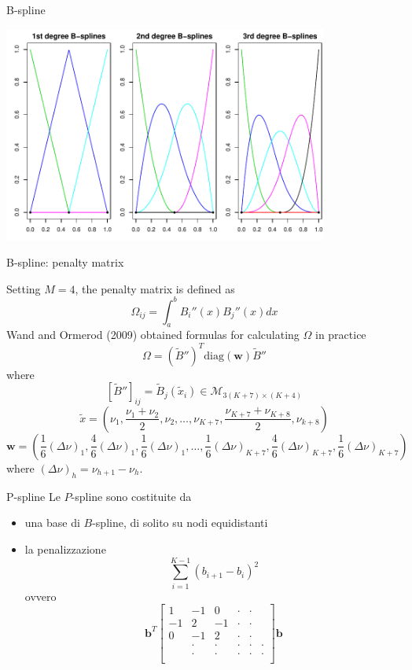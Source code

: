 \documentclass{beamer}\usepackage[]{graphicx}\usepackage[]{color}
\makeatletter
\newenvironment{kframe}{%
 \def\at@end@of@kframe{}%
 \ifinner\ifhmode%
  \def\at@end@of@kframe{\end{minipage}}%
  \begin{minipage}{\columnwidth}%
 \fi\fi%
 \def\FrameCommand##1{\hskip\@totalleftmargin \hskip-\fboxsep
 \colorbox{shadecolor}{##1}\hskip-\fboxsep
     \hskip-\linewidth \hskip-\@totalleftmargin \hskip\columnwidth}%
 \MakeFramed {\advance\hsize-\width
   \@totalleftmargin\z@ \linewidth\hsize
   \@setminipage}}%
 {\par\unskip\endMakeFramed%
 \at@end@of@kframe}
\newenvironment{knitrout}{}{} %
\makeatother
\begin{document}
\begin{frame}[fragile,allowframebreaks=0.95]{B-spline}
\begin{knitrout}
\color{fgcolor}\begin{kframe}


{\ttfamily\noindent\bfseries{}}\end{kframe}
\includegraphics[width=0.8\textwidth,height=0.8\textheight]{figure/020-regression-1bsplineA-1} 

\end{knitrout}
\end{frame}

\begin{frame}{B-spline: penalty matrix}

Setting $M=4$, the penalty matrix is defined as
\[ \Omega_{ij} = \int_a^b B_i''(x)B_j''(x)dx  \]
Wand and Ormerod (2009) obtained formulas for calculating $\Omega$ in practice
\[ \Omega = (\tilde{B}'')^T \mbox{diag}(\mathbf w) \tilde{B}''  \]
where 
\[ [\tilde{B}'']_{ij} = \tilde{B}_j(\tilde{x}_i) \in\mathcal M_{3(K+7)\times(K+4)}\]
\[ \tilde{x} = \left(\nu_1,\frac{\nu_1+\nu_2}{2},\nu_2,\ldots,\nu_{K+7},\frac{\nu_{K+7}+\nu_{K+8}}{2},\nu_{k+8} \right) \]
\[ {\mathbf w} = \left(\frac{1}{6}(\Delta\nu)_1,\frac{4}{6}(\Delta\nu)_1,\frac{1}{6}(\Delta\nu)_1, \ldots, \frac{1}{6}(\Delta\nu)_{K+7},\frac{4}{6}(\Delta\nu)_{K+7},\frac{1}{6}(\Delta\nu)_{K+7}\right) \]
where $(\Delta\nu)_h=\nu_{h+1}-\nu_h$.
\end{frame}

\begin{frame}{P-spline}
Le $P$-spline sono costituite da
\begin{itemize}
\item una base di $B$-spline, di solito su nodi equidistanti
\item la penalizzazione
\[ \sum_{i=1}^{K-1} (b_{i+1}-b_i)^2 \]
ovvero
\[ {\bm b}^T 
\begin{bmatrix} 
1  & -1 & 0  & \cdot & \cdot \\ 
-1 &  2 & -1 & \cdot & \cdot \\
 0 & -1 &  2 & \cdot & \cdot \\
& \cdot& \cdot& \cdot& \cdot & \cdot \\
& \cdot& \cdot& \cdot& \cdot & \cdot \\
\end{bmatrix} 
{\bm b} \]
\end{itemize}
\end{frame}
\end{document}
